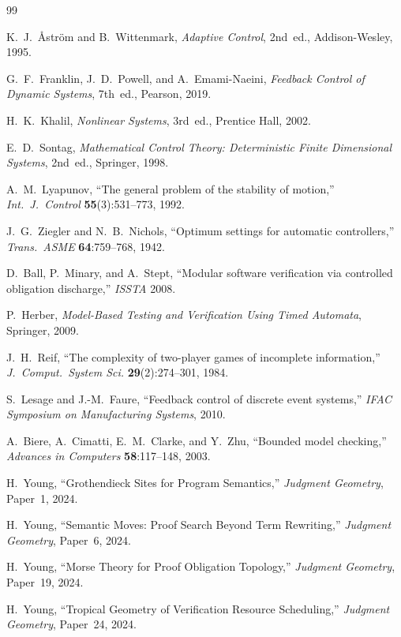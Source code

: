 \documentclass[11pt]{article}
\begin{document}
\begin{thebibliography}{99}

  K.~J.~\AA{}str\"om and B.~Wittenmark,
  \textit{Adaptive Control}, 2nd~ed., Addison-Wesley, 1995.

  G.~F.~Franklin, J.~D.~Powell, and A.~Emami-Naeini,
  \textit{Feedback Control of Dynamic Systems},
  7th~ed., Pearson, 2019.

  H.~K.~Khalil,
  \textit{Nonlinear Systems},
  3rd~ed., Prentice Hall, 2002.

  E.~D.~Sontag,
  \textit{Mathematical Control Theory: Deterministic Finite Dimensional Systems},
  2nd~ed., Springer, 1998.

  A.~M.~Lyapunov,
  ``The general problem of the stability of motion,''
  \textit{Int.\ J.\ Control} \textbf{55}(3):531--773, 1992.

  J.~G.~Ziegler and N.~B.~Nichols,
  ``Optimum settings for automatic controllers,''
  \textit{Trans.\ ASME} \textbf{64}:759--768, 1942.

  D.~Ball, P.~Minary, and A.~Stept,
  ``Modular software verification via controlled obligation discharge,''
  \textit{ISSTA} 2008.

  P.~Herber,
  \textit{Model-Based Testing and Verification Using Timed Automata},
  Springer, 2009.

  J.~H.~Reif,
  ``The complexity of two-player games of incomplete information,''
  \textit{J.\ Comput.\ System Sci.} \textbf{29}(2):274--301, 1984.

  S.~Lesage and J.-M.~Faure,
  ``Feedback control of discrete event systems,''
  \textit{IFAC Symposium on Manufacturing Systems}, 2010.

  A.~Biere, A.~Cimatti, E.~M.~Clarke, and Y.~Zhu,
  ``Bounded model checking,''
  \textit{Advances in Computers} \textbf{58}:117--148, 2003.

  H.~Young,
  ``Grothendieck Sites for Program Semantics,''
  \textit{Judgment Geometry}, Paper~1, 2024.

  H.~Young,
  ``Semantic Moves: Proof Search Beyond Term Rewriting,''
  \textit{Judgment Geometry}, Paper~6, 2024.

  H.~Young,
  ``Morse Theory for Proof Obligation Topology,''
  \textit{Judgment Geometry}, Paper~19, 2024.

  H.~Young,
  ``Tropical Geometry of Verification Resource Scheduling,''
  \textit{Judgment Geometry}, Paper~24, 2024.

\end{thebibliography}
\end{document}
